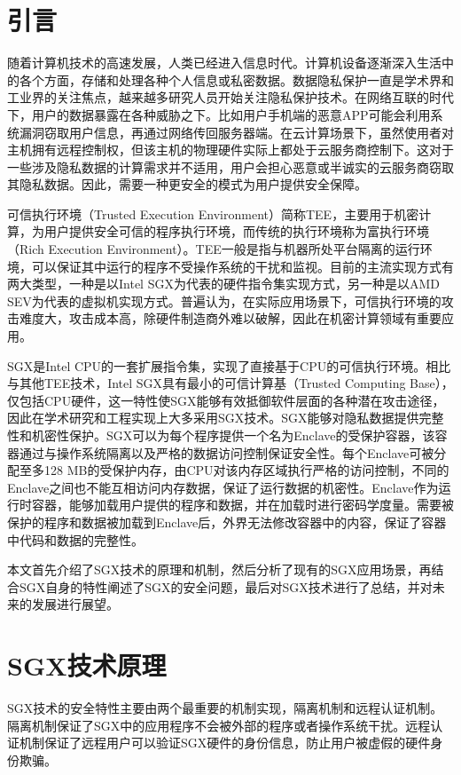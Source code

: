 \documentclass[twocolumn]{source/Paper}
\date{\today}
\begin{document}
    \makeheader
    \section{引言}
    随着计算机技术的高速发展，人类已经进入信息时代。计算机设备逐渐深入生活中的各个方面，存储和处理各种个人信息或私密数据。数据隐私保护一直是学术界和工业界的关注焦点，越来越多研究人员开始关注隐私保护技术。在网络互联的时代下，用户的数据暴露在各种威胁之下。比如用户手机端的恶意APP可能会利用系统漏洞窃取用户信息，再通过网络传回服务器端。在云计算场景下，虽然使用者对主机拥有远程控制权，但该主机的物理硬件实际上都处于云服务商控制下。这对于一些涉及隐私数据的计算需求并不适用，用户会担心恶意或半诚实的云服务商窃取其隐私数据。因此，需要一种更安全的模式为用户提供安全保障。

    可信执行环境（Trusted Execution Environment）简称TEE，主要用于机密计算，为用户提供安全可信的程序执行环境，而传统的执行环境称为富执行环境（Rich Execution Environment）。TEE一般是指与机器所处平台隔离的运行环境，可以保证其中运行的程序不受操作系统的干扰和监视。目前的主流实现方式有两大类型，一种是以Intel SGX为代表的硬件指令集实现方式，另一种是以AMD SEV为代表的虚拟机实现方式。普遍认为，在实际应用场景下，可信执行环境的攻击难度大，攻击成本高，除硬件制造商外难以破解，因此在机密计算领域有重要应用。

    SGX是Intel CPU的一套扩展指令集，实现了直接基于CPU的可信执行环境。相比与其他TEE技术，Intel SGX具有最小的可信计算基（Trusted Computing Base），仅包括CPU硬件，这一特性使SGX能够有效抵御软件层面的各种潜在攻击途径，因此在学术研究和工程实现上大多采用SGX技术。SGX能够对隐私数据提供完整性和机密性保护。SGX可以为每个程序提供一个名为Enclave的受保护容器，该容器通过与操作系统隔离以及严格的数据访问控制保证安全性。每个Enclave可被分配至多128 MB的受保护内存，由CPU对该内存区域执行严格的访问控制，不同的Enclave之间也不能互相访问内存数据，保证了运行数据的机密性。Enclave作为运行时容器，能够加载用户提供的程序和数据，并在加载时进行密码学度量。需要被保护的程序和数据被加载到Enclave后，外界无法修改容器中的内容，保证了容器中代码和数据的完整性。




    本文首先介绍了SGX技术的原理和机制，然后分析了现有的SGX应用场景，再结合SGX自身的特性阐述了SGX的安全问题，最后对SGX技术进行了总结，并对未来的发展进行展望。


    \section{SGX技术原理}
    SGX技术的安全特性主要由两个最重要的机制实现，隔离机制和远程认证机制。隔离机制保证了SGX中的应用程序不会被外部的程序或者操作系统干扰。远程认证机制保证了远程用户可以验证SGX硬件的身份信息，防止用户被虚假的硬件身份欺骗。
    
\end{document}
